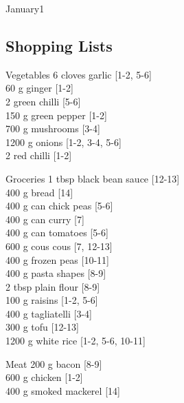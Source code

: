 \begin{menu}{January1}
    \subsection*{Shopping Lists}
      \begin{shoppinglist}{Vegetables}
      6 cloves garlic {\scriptsize[1-2, 5-6]}\\
      60 g ginger {\scriptsize[1-2]}\\
      2  green chilli {\scriptsize[5-6]}\\
      150 g green pepper {\scriptsize[1-2]}\\
      700 g mushrooms {\scriptsize[3-4]}\\
      1200 g onions {\scriptsize[1-2, 3-4, 5-6]}\\
      2  red chilli {\scriptsize[1-2]}\\
      \end{shoppinglist}%
      \begin{shoppinglist}{Groceries}
      1 tbsp black bean sauce {\scriptsize[12-13]}\\
      400 g bread {\scriptsize[14]}\\
      400 g can chick peas {\scriptsize[5-6]}\\
      400 g can curry {\scriptsize[7]}\\
      400 g can tomatoes {\scriptsize[5-6]}\\
      600 g cous cous {\scriptsize[7, 12-13]}\\
      400 g frozen peas {\scriptsize[10-11]}\\
      400 g pasta shapes {\scriptsize[8-9]}\\
      2 tbsp plain flour {\scriptsize[8-9]}\\
      100 g raisins {\scriptsize[1-2, 5-6]}\\
      400 g tagliatelli {\scriptsize[3-4]}\\
      300 g tofu {\scriptsize[12-13]}\\
      1200 g white rice {\scriptsize[1-2, 5-6, 10-11]}\\
      \end{shoppinglist}%
      \par\vfil %
      \begin{shoppinglist}{Meat}
      200 g bacon {\scriptsize[8-9]}\\
      600 g chicken {\scriptsize[1-2]}\\
      400 g smoked mackerel {\scriptsize[14]}\\

\end{shoppinglist}
\end{menu}
